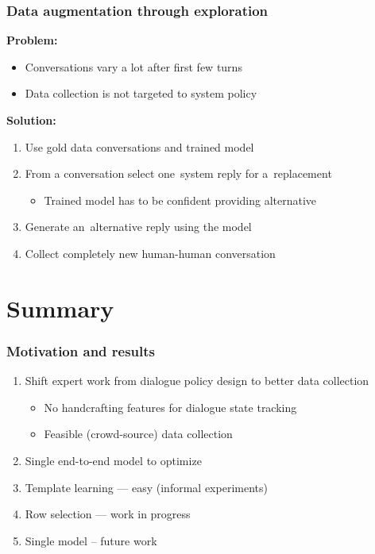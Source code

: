 \documentclass[10pt, compress,british,xcolor={svgnames,dvipsnames,x11names},trans]{beamer}
\begin{document}
\begin{frame}\frametitle{Data augmentation through exploration}
    {\bf Problem:}
    \begin{itemize}
        \item Conversations vary a lot after first few turns
        \item Data collection is not targeted to system policy
    \end{itemize}
    {\bf Solution:} \\
    \begin{enumerate}
        \item Use gold data conversations and trained model   
        \item From a conversation select one~system reply for a~replacement
            \begin{itemize}
                \item Trained model has to be confident providing alternative
            \end{itemize}
        \item Generate an~alternative reply using the model
        \item Collect completely new human-human conversation 
    \end{enumerate}
\end{frame}

\section{Summary}

\begin{frame}\frametitle{Motivation and results}
    \begin{enumerate}
        \item Shift expert work from dialogue policy design to better data collection 
        \begin{itemize}
            \item No handcrafting features for dialogue state tracking~\cite{platek_recurrent_2016}
            \item Feasible (crowd-source) data collection~\cite{platek2016wochat}
        \end{itemize}
        \item Single end-to-end model to optimize
            \item Template learning --- easy (informal experiments)
            \item Row selection --- work in progress
            \item Single model -- future work
    \end{enumerate}
\end{frame}
\end{document}

